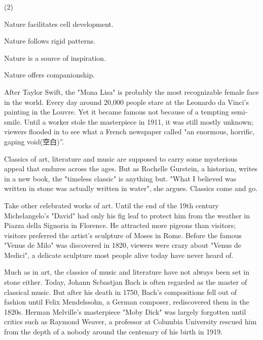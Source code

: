 \documentclass{英语试卷}
\begin{document}
\begin{choices}(2)
  \item Nature facilitates cell development.
  \item Nature follows rigid patterns.
  \item Nature is a source of inspiration.
  \item Nature offers companionship.
\end{choices}
\par After Taylor Swift, the "Mona Lisa" is probably the most recognizable female face in the world. Every day around 20,000 people stare at the Leonardo da Vinci's painting in the Louvre. Yet it became famous not because of a tempting semi-smile. Until a worker stole the masterpiece in 1911, it was still mostly unknown; viewers flooded in to see what a French newspaper called "an enormous, horrific, gaping void(空白)”.\par
\par Classics of art, literature and music are supposed to carry some mysterious appeal that endures across the ages. But as Rochelle Gurstein, a historian, writes in a new book, the "timeless classic" is anything but. "What I believed was written in stone was actually written in water", she argues. Classics come and go.\par
\par Take other celebrated works of art. Until the end of the 19th century Michelangelo's "David" had only his fig leaf to protect him from the weather in Piazza della Signoria in Florence. He attracted more pigeons than visitors; visitors preferred the artist's sculpture of Moses in Rome. Before the famous "Venus de Milo" was discovered in 1820, viewers were crazy about "Venus de Medici", a delicate sculpture most people alive today have never heard of.\par
\par Much as in art, the classics of music and literature have not always been set in stone either. Today, Johann Scbastjan Bach is often regarded as the master of classical music. But after his death in 1750, Bach's compositions fell out of fashion until Felix Mendelssohn, a German composer, rediscovered them in the 1820s. Herman Melville's masterpiece "Moby Dick" was largely forgotten until critics such as Raymond Weaver, a professor at Columbia University rescued him from the depth of a nobody around the centenary of his birth in 1919.\par
\end{document}
